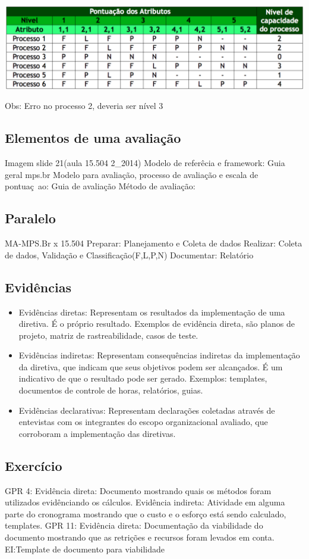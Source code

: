 \documentclass{article}
\begin{document}
	\begin{center}
	\includegraphics[scale=0.37]{exemplo_pontuacao}	
	\end{center}
	Obs: Erro no processo 2, deveria ser nível 3
\subsection{Elementos de uma avaliação}
	Imagem slide 21(aula 15.504 2_2014)
	Modelo de referêcia e framework: Guia geral mps.br
	Modelo para avaliação, processo de avaliação e escala de pontuaç~ao: Guia de avaliação
	Método de avaliação: 
\subsection{Paralelo}
	MA-MPS.Br x 15.504
	Preparar: Planejamento e Coleta de dados
	Realizar: Coleta de dados, Validação e Classificação(F,L,P,N)
	Documentar: Relatório
\subsection{Evidências}

	\begin{itemize}
	\item Evidências diretas: Representam os resultados da implementação de uma diretiva. É o próprio resultado. Exemplos de evidência direta, são planos de projeto, matriz de rastreabilidade, casos de teste.
	
	\item Evidências indiretas: Representam consequências indiretas da implementação da diretiva, que indicam que seus objetivos podem ser alcançados. É um indicativo de que o resultado pode ser gerado. Exemplos: templates, documentos de controle de horas, relatórios, guias.

	\item Evidências declarativas: Representam declarações coletadas através de entevistas com os integrantes do escopo organizacional avaliado, que corroboram a implementação das diretivas.
	\end{itemize}

\subsection{Exercício}
	GPR 4: 
		Evidência direta: Documento mostrando quais os métodos foram utilizados evidênciando os cálculos.
		Evidência indireta: Atividade em alguma parte do cronograma mostrando que o custo e o esforço está sendo calculado, templates.
	GPR 11:
		Evidência direta: Documentação da viabilidade do documento mostrando que as retrições e recursos foram levados em conta.
		EI:Template de documento para viabilidade
\end{document}
